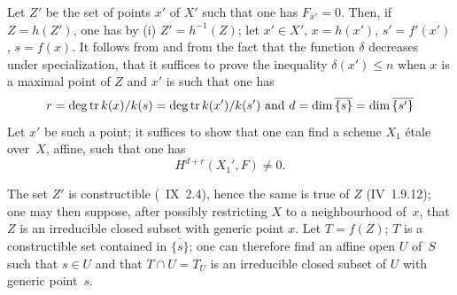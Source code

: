Let $Z'$ be the set of points $x'$ of $X'$ such that one has $F_{\bar{x}'} = 0$. Then, if $Z=h(Z')$, one has by \textup{(i)} $Z' = h^{-1}(Z)$; let $x' \in X'$, $x=h(x')$, $s'=f'(x')$, $s=f(x)$. It follows from  and from the fact that the function $\delta$ decreases under specialization, that it suffices to prove the inequality $\delta(x') \leq n$ when $x$ is a maximal point of $Z$ and $x'$ is such that one has
$$r=\deg \operatorname{tr} k(x)/k(s) = \deg \operatorname{tr} k(x')/k(s') \text{ and }d=\dim \overline{\{s\}} = \dim\overline{\{s'\}}$$
Let $x'$ be such a point; it suffices to show that one can find a scheme $X_1$ \'etale over~$X$, affine, such that one has
$$
H^{d+r}(X_1', F) \neq 0.
$$

The set $Z'$ is constructible (~IX~2.4), hence the same is true of $Z$ (\EGA IV~1.9.12); one may then suppose, after possibly restricting $X$ to a neighbourhood of~$x$, that $Z$ is an irreducible closed subset with generic point $x$. Let $T=f(Z)$; $T$ is a constructible set contained in $\overline{\{s\}}$; one can therefore find an affine open $U$ of~$S$ such that $s \in U$ and that $T \cap U = T_U$ is an irreducible closed subset of $U$ with generic point~$s$.

